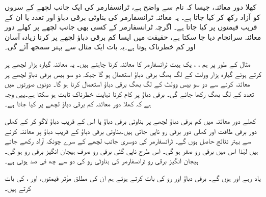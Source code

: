 کھلا  دور معائنہ، جیسا کہ نام سے واضح  ہے،  ٹرانسفارمر کی ایک جانب لچھے کے سروں کو آزاد رکھ کر کیا جاتا ہے۔ یہ معائنہ ٹرانسفارمر کی بناوٹی برقی دباؤ اور تعدد یا ان کے قریب قیمتوں پر کیا جاتا ہے۔ اگرچہ ٹرانسفارمر کے کسی بھی جانب  لچھے پر کھلے دور معائنہ  سرانجام دیا جا سکتا ہے، حقیقت میں ایسا کم برقی دباؤ لچھے پر کرنا زیادہ آسان اور کم خطرناک  ہوتا ہے۔یہ بات ایک مثال سے بہتر  سمجھ آئے گی۔

مثال کے طور پر  ہم  ، ،  یک ہیت  ٹرانسفارمر کا معائنہ کرنا چاہتے ہیں۔ یہ معائنہ گیارہ ہزار لچھے پر  کرتے ہوئے  گیارہ ہزار وولٹ  کے لگ بھگ برقی دباؤ استعمال ہو گا جبکہ دو سو بیس برقی دباؤ  لچھے پر معائنہ کرنے سے دو سو بیس وولٹ کے لگ بھگ برقی دباؤ  استعمال کرنا ہو  گا۔ دونوں صورتوں میں تعدد  کے لگ بھگ رکھا جائے گی۔ برقی دباؤ پر کام کرنا نہایت خطرناک ثابت ہو سکتا ہے۔یہی وجہ ہے کہ کھلا دور  معائنہ کم برقی دباؤ لچھے پر کیا جاتا ہے۔

کھلے دور  معائنہ میں کم برقی دباؤ لچھے پر بناوٹی برقی دباؤ یا اس کے قریب  دباؤ  لاگو کر کے کھلی دور برقی طاقت  اور  کھلی  دور برقی رو   ناپی جاتی ہیں۔بناوٹی  برقی دباؤ کے  قریب  دباؤ پر معائنہ کرنے سے  بہتر نتائج حاصل ہوں گے۔ ٹرانسفارمر کی دوسری جانب لچھے کے سرے چونکہ آزاد رکھے جاتے ہیں لہٰذا اس میں  برقی رو صفر ہو گی۔  اس طرح  ناپی گئی برقی رو صرف ہیجان انگیز برقی رو  ہو گی۔  ہیجان انگیز برقی رو ٹرانسفارمر کی  بناوٹی رو کی  دو سے چھ  فی صد ہوتی ہے۔

یاد رہے  اور  ہوں گے۔ برقی دباؤ اور رو کی بات کرتے ہوئے ہم ان کی مطلق مؤثر قیمتوں،  اور ، کی بات کرتے ہیں۔ 

